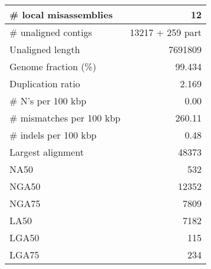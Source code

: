 \documentclass[12pt,a4paper]{article}
\begin{document}
\begin{table}[ht]
\begin{center}
\begin{tabular}{|l*{1}{|r}|}
\# local misassemblies & 12 \\ \hline
\# unaligned contigs & 13217 + 259 part \\ \hline
Unaligned length & 7691809 \\ \hline
Genome fraction (\%) & 99.434 \\ \hline
Duplication ratio & 2.169 \\ \hline
\# N's per 100 kbp & 0.00 \\ \hline
\# mismatches per 100 kbp & 260.11 \\ \hline
\# indels per 100 kbp & 0.48 \\ \hline
Largest alignment & 48373 \\ \hline
NA50 & 532 \\ \hline
NGA50 & 12352 \\ \hline
NGA75 & 7809 \\ \hline
LA50 & 7182 \\ \hline
LGA50 & 115 \\ \hline
LGA75 & 234 \\ \hline
\end{tabular}
\end{center}
\end{table}
\end{document}
